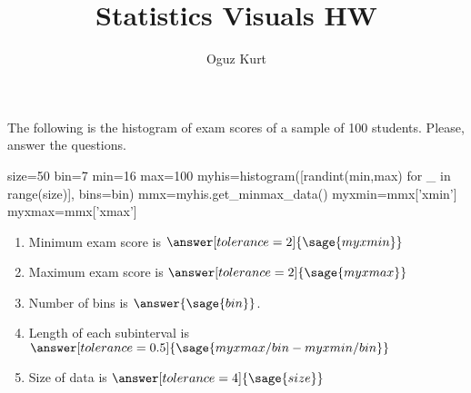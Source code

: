 \documentclass{ximera}
\title{Statistics Visuals HW}
\author{Oguz Kurt}
\begin{document}
\begin{abstract}
\empty
\end{abstract}
\maketitle
\begin{problem}
The following is the histogram of exam scores of a sample of 100 students. Please, answer the questions.

\begin{sagesilent}
size=50
bin=7
min=16
max=100
myhis=histogram([randint(min,max) for _ in range(size)], bins=bin)
mmx=myhis.get_minmax_data()
myxmin=mmx['xmin']    
myxmax=mmx['xmax']    
\end{sagesilent}


\begin{enumerate}
    \item Minimum exam score is $\answer[tolerance=2]{\sage{myxmin}}$
    \item Maximum exam score is $\answer[tolerance=2]{\sage{myxmax}}$
    \item Number of bins is $\answer{\sage{bin}}$.
    \item Length of each subinterval is $\answer[tolerance=0.5]{\sage{myxmax/bin-myxmin/bin}}$
    \item Size of data is $\answer[tolerance=4]{\sage{size}}$
\end{enumerate}
\end{problem}
\end{document}
